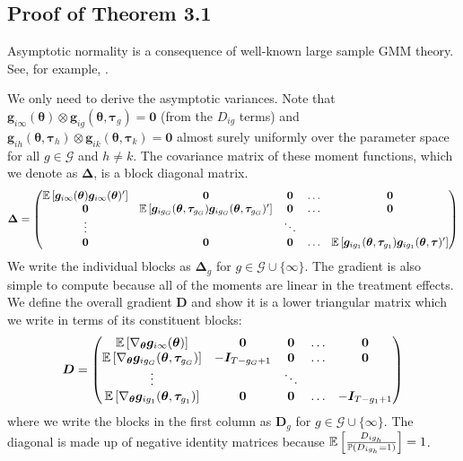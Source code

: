 \documentclass[12pt]{article}
\begin{document}
\subsection*{Proof of Theorem 3.1}

Asymptotic normality is a consequence of well-known large sample GMM theory. See, for example, \citet{Hansen_1982}.

We only need to derive the asymptotic variances. Note that $\bm g_{i\infty}(\bm \theta) \otimes \bm g_{ig}(\bm \theta, \bm \tau_g) = \bm 0$ (from the $D_{ig}$ terms) and $\bm g_{ih}(\bm \theta, \bm \tau_h) \otimes \bm g_{ik}(\bm \theta, \bm \tau_k) = \bm 0$ almost surely uniformly over the parameter space for all $g \in \mathcal{G}$ and $h \neq k$. The covariance matrix of these moment functions, which we denote as $\bm \Delta$, is a block diagonal matrix.
\begin{equation*}
    \bm \Delta =
    \begin{pmatrix}
        \mathbb{E}\left[\bm g_{i \infty}(\bm \theta) \bm g_{i \infty}(\bm \theta)'\right] & \bm 0 & \bm 0 & \hdots & \bm 0\\
        \bm 0 &  \mathbb{E}\left[\bm g_{i g_G}(\bm \theta, \bm \tau_{g_G}) \bm g_{i g_G}(\bm \theta, \bm \tau_{g_G})' \right] & \bm 0 & \hdots & \bm 0\\
        \vdots & & \ddots  &\\
        \bm 0 & \bm 0 & \bm 0 & \hdots & \mathbb{E}\left[ \bm g_{i g_1}(\bm \theta, \bm \tau_{g_1}) \bm g_{i g_1}(\bm \theta, \bm \tau)'\right]
    \end{pmatrix}
\end{equation*}
We write the individual blocks as $\bm \Delta_g$ for $g \in \mathcal{G} \cup \{ \infty \}$. The gradient is also simple to compute because all of the moments are linear in the treatment effects. We define the overall gradient $\bm D$ and show it is a lower triangular matrix which we write in terms of its constituent blocks:
\begin{equation*}
    \bm D = 
    \begin{pmatrix}
        \mathbb{E}\left[\nabla_{\bm \theta} \bm g_{i\infty}(\bm \theta) \right] & \bm 0 & \bm 0 & \hdots & \bm 0\\
        \mathbb{E}\left[\nabla_{\bm \theta} \bm g_{ig_G}(\bm \theta, \bm \tau_{g_G})\right] & -\bm I_{T - g_G + 1} & \bm 0 & \hdots & \bm 0\\
        \vdots & & \ddots  &\\
        \mathbb{E}\left[\nabla_{\bm \theta} \bm g_{ig_1}(\bm \theta, \bm \tau_{g_1})\right] & \bm 0 & \bm 0 & \hdots & -\bm I_{T - g_1 + 1}
    \end{pmatrix}
\end{equation*}
where we write the blocks in the first column as $\bm D_g$ for $g \in \mathcal{G} \cup \{ \infty \}$. The diagonal is made up of negative identity matrices because $\mathbb{E}\left[\frac{D_{ig_h}}{\mathbb{P}(D_{ig_h} = 1)}\right] = 1$.
\end{document}
